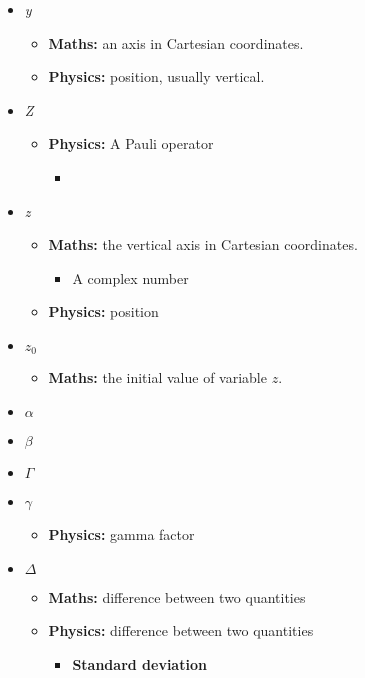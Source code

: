 \begin{itemize}
				\item \textit{y}
				\begin{itemize}
					\item\textbf{Maths:} an axis in Cartesian coordinates.
					\item \textbf{Physics:} position, usually vertical.
				\end{itemize}
				
				\item \textit{Z}
				\begin{itemize}
					\item\textbf{Physics:} A Pauli operator
					\begin{itemize}
						\item 
					\end{itemize}
				\end{itemize}
				
				\item \textit{z}
				\begin{itemize}
					\item\textbf{Maths:} the vertical axis in Cartesian coordinates.
					\begin{itemize}
						\item A complex number
					\end{itemize}
					\item \textbf{Physics:} position
				\end{itemize}
				
				\item $z_0$
				\begin{itemize}
					\item\textbf{Maths:} the initial value of variable $z$.
				\end{itemize}
								
				\item $\alpha$
				
				\item $\beta$
				
				\item $\Gamma$
				
				\item $\gamma$
				\begin{itemize}
					\item \textbf{Physics:} gamma factor
				\end{itemize}
				
				\item $\Delta$
				\begin{itemize}
					\item \textbf{Maths:} difference between two quantities
					\item \textbf{Physics:} difference between two quantities
					\begin{itemize}
						\item \textbf{Standard deviation}
					\end{itemize}
				\end{itemize}
				

\end{itemize}
